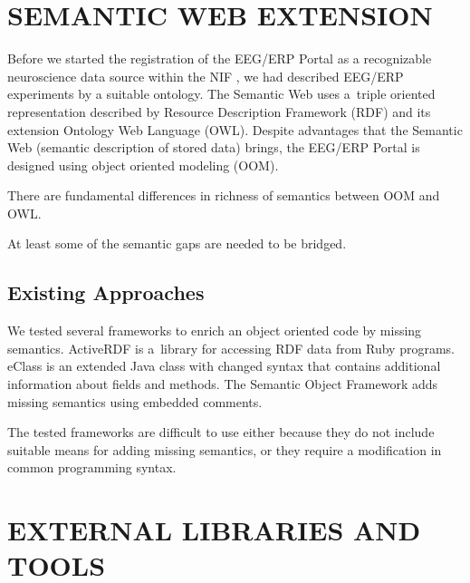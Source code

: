 \documentclass[a4paper,twoside]{article}
\begin{document}
\section{\label{sec:Semantic Web Extension}\uppercase{Semantic Web Extension}}

\noindent Before we started the registration of the EEG/ERP Portal as a recognizable neuroscience data source within the NIF \cite{NIF-Neuroinformatics}, we had described EEG/ERP experiments by a suitable ontology. The Semantic Web uses a~triple oriented representation described by Resource Description Framework (RDF) and its extension Ontology Web Language (OWL). Despite advantages that the Semantic Web (semantic description of stored data) brings, the EEG/ERP Portal is designed using object oriented modeling (OOM).

There are fundamental differences in richness of semantics between OOM and OWL.

At least some of the semantic gaps are needed to be bridged.

\subsection{\label{subsec:Existing Approaches}Existing Approaches}
We tested several frameworks to enrich an object oriented code by missing semantics. ActiveRDF \cite{ActiveRDF} is a~library for accessing RDF data from Ruby programs. eClass \cite{Web-Information-Representation} is an extended Java class with changed syntax that contains additional information about fields and methods. The Semantic Object Framework \cite{SOF} adds missing semantics using embedded comments.

The tested frameworks are difficult to use either because they do not include suitable means for adding missing semantics, or they require a modification in common programming syntax.

\section{\uppercase{External Libraries and Tools}}
\end{document}
